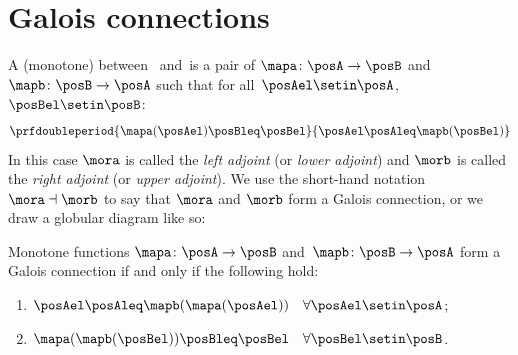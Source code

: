 \section{Galois connections}\label{sec:galois-connections}


\begin{ctdefinition}\label{def:monotone-galois-connection}
    A (monotone)  between ~\posA and~\posB is a pair of 
    $\mapa\colon \posA\to \posB$ and~$\mapb\colon \posB\to \posA$ such that for all~$\posAel\setin \posA$,~$\posBel\setin \posB$:
    \begin{equation}
        \prfdoubleperiod{\mapa(\posAel) \posBleq \posBel}{\posAel \posAleq \mapb(\posBel)}
    \end{equation}
    In this case $\mora$ is called the \emph{left adjoint} (or \emph{lower adjoint}) and $\morb$ is called the \emph{right adjoint} (or \emph{upper adjoint}).
    We use the short-hand notation $\mora \dashv \morb$ to say that $\mora$ and $\morb$ form a Galois connection, or we draw a globular diagram like so:
\end{ctdefinition}

\begin{lemma}\label{lem:alternative-def-Galois-connection}
    Monotone functions $\mapa\colon \posA\to \posB$ and~$\mapb\colon \posB\to \posA$ form a Galois connection if and only if the following hold:
    \begin{enumerate}
        \item $\posAel\posAleq \mapb(\mapa(\posAel)) \quad \forall \posAel\setin \posA$;
        \item $\mapa(\mapb(\posBel)) \posBleq \posBel \quad \forall \posBel\setin \posB$.
    \end{enumerate}
\end{lemma}


